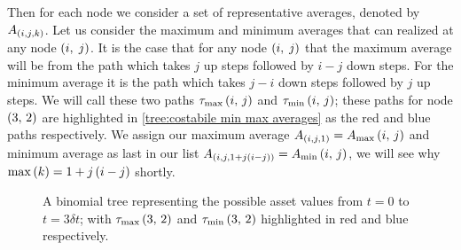 Then for each node we consider a set of representative averages, denoted by \(A_{\left(i,j,k\right)}\). Let us consider the maximum and minimum averages that can realized at any node \(\left(i,\;j\right)\). It is the case that for any node \(\left(i,\;j\right)\) that the maximum average will be from the path which takes \(j\) up steps followed by \(i-j\) down steps. For the minimum average it is the path which takes \(j-i\) down steps followed by \(j\) up steps. We will call these two paths \(\tau_{\text{max}}\left(i,\,j\right) \) and \(\tau_{\text{min}}\left(i,\,j\right) \); these paths for node \(\left(3,\,2\right)\) are highlighted in \autoref{tree:costabile min max averages} as the red and blue paths respectively. We assign our maximum average \(A_{\left(i,j,1\right)} = A_\text{max}\left(i,\,j\right)\) and minimum average as last in our list \(A_{\left(i,j,1+ j\left(i-j\right)\right)} = A_\text{min}\left(i,\,j\right)\), we will see why \(\max\left(k\right) = 1+j\left(i-j\right)\) shortly.

\begin{figure}[H]
    \centering
    \caption{A binomial tree representing the possible asset values from \(t=0\) to \(t=3\delta t\); with \(\tau_{\text{max}}\left(3,\,2\right)\) and \(\tau_{\text{min}}\left(3,\,2\right)\) highlighted in red and blue respectively.}\label{tree:costabile min max averages}
\end{figure}

